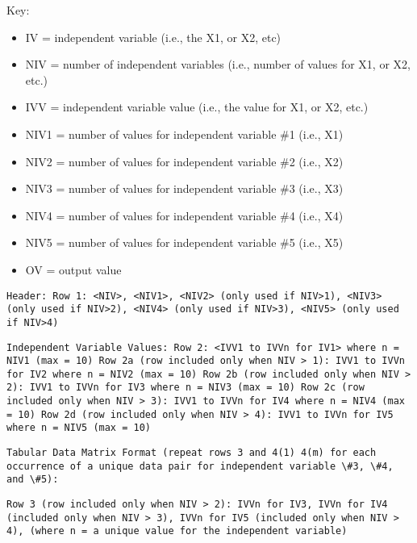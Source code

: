Key:

\begin{itemize}
\item
  IV = independent variable (i.e., the X1, or X2, etc)
\item
  NIV = number of independent variables (i.e., number of values for X1, or X2, etc.)
\item
  IVV = independent variable value (i.e., the value for X1, or X2, etc.)
\item
  NIV1 = number of values for independent variable \#1 (i.e., X1)
\item
  NIV2 = number of values for independent variable \#2 (i.e., X2)
\item
  NIV3 = number of values for independent variable \#3 (i.e., X3)
\item
  NIV4 = number of values for independent variable \#4 (i.e., X4)
\item
  NIV5 = number of values for independent variable \#5 (i.e., X5)
\item
  OV = output value
\end{itemize}

\begin{lstlisting}
Header: Row 1: <NIV>, <NIV1>, <NIV2> (only used if NIV>1), <NIV3> (only used if NIV>2), <NIV4> (only used if NIV>3), <NIV5> (only used if NIV>4)
\end{lstlisting}

\begin{lstlisting}
Independent Variable Values: Row 2: <IVV1 to IVVn for IV1> where n = NIV1 (max = 10) Row 2a (row included only when NIV > 1): IVV1 to IVVn for IV2 where n = NIV2 (max = 10) Row 2b (row included only when NIV > 2): IVV1 to IVVn for IV3 where n = NIV3 (max = 10) Row 2c (row included only when NIV > 3): IVV1 to IVVn for IV4 where n = NIV4 (max = 10) Row 2d (row included only when NIV > 4): IVV1 to IVVn for IV5 where n = NIV5 (max = 10)
\end{lstlisting}

\begin{lstlisting}
Tabular Data Matrix Format (repeat rows 3 and 4(1) 4(m) for each occurrence of a unique data pair for independent variable \#3, \#4, and \#5):
\end{lstlisting}

\begin{lstlisting}
Row 3 (row included only when NIV > 2): IVVn for IV3, IVVn for IV4 (included only when NIV > 3), IVVn for IV5 (included only when NIV > 4), (where n = a unique value for the independent variable)
\end{lstlisting}

